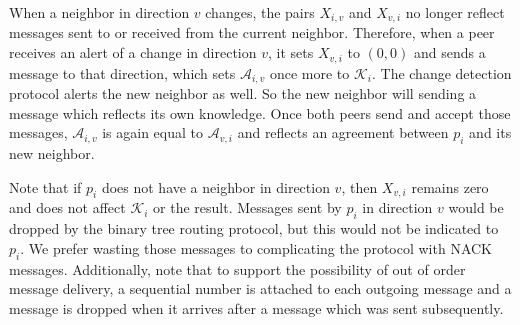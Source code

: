 \documentclass[12pt,english,journal]{elsarticle}
\numberwithin{equation}{section}
\numberwithin{figure}{section}
\theoremstyle{plain}
\theoremstyle{plain}
\begin{document}
When a neighbor in direction $v$ changes, the pairs $X_{i,v}$ and
$X_{v,i}$ no longer reflect messages sent to or received from the
current neighbor. Therefore, when a peer receives an alert of a change
in direction $v$, it sets $X_{v,i}$ to $\left(0,0\right)$ and sends
a message to that direction, which sets $\mathcal{A}_{i,v}$ once
more to $\mathcal{K}_{i}$. The change detection protocol alerts the
new neighbor as well. So the new neighbor will sending a message which
reflects its own knowledge. Once both peers send and accept those
messages, $\mathcal{A}_{i,v}$ is again equal to $\mathcal{A}_{v,i}$
and reflects an agreement between $p_{i}$ and its new neighbor.

Note that if $p_{i}$ does not have a neighbor in direction $v$,
then $X_{v,i}$ remains zero and does not affect $\mathcal{K}_{i}$
or the result. Messages sent by $p_{i}$ in direction $v$ would be
dropped by the binary tree routing protocol, but this would not be
indicated to $p_{i}$. We prefer wasting those messages to complicating
the protocol with NACK messages. Additionally, note that to support
the possibility of out of order message delivery, a sequential number
is attached to each outgoing message and a message is dropped when
it arrives after a message which was sent subsequently.
\end{document}
